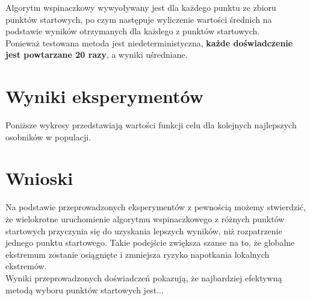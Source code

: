 \documentclass{article}
\begin{document}
Algorytm wspinaczkowy wywyoływany jest dla każdego punktu ze zbioru punktów startowych, po czym następuje wyliczenie wartości średnich na podstawie wyników otrzymanych dla każdego z punktów startowych.\\
Ponieważ testowana metoda jest niedeterministyczna, \textbf{każde doświadczenie jest powtarzane 20 razy}, a wyniki uśredniane.\\


\section{Wyniki eksperymentów}
Poniższe wykresy przedstawiają wartości funkcji celu dla kolejnych najlepszych osobników w populacji. 


\section{Wnioski}

Na podstawie przeprowadzonych eksperymentów z pewnością możemy stwierdzić, że wielokrotne uruchomienie algorytmu wspinaczkowego z różnych punktów startowych przyczynia się do uzyskania lepszych wyników, niż rozpatrzenie jednego punktu startowego. Takie podejście zwiększa szanse na to, że globalne ekstremum zostanie osiągnięte i zmniejsza ryzyko napotkania lokalnych ekstremów.\\

Wyniki przeprowadzonych doświadczeń pokazują, że najbardziej efektywną metodą wyboru punktów startowych jest...
\end{document}
